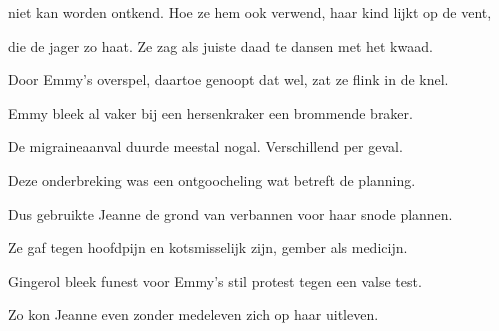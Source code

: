 niet kan worden ontkend.
Hoe ze hem ook verwend,
haar kind lijkt op de vent,

die de jager zo haat.
Ze zag als juiste daad
te dansen met het kwaad.

Door Emmy’s overspel,
daartoe genoopt dat wel,
zat ze flink in de knel.

Emmy bleek al vaker
bij een hersenkraker
een brommende braker.

De migraineaanval
duurde meestal nogal.
Verschillend per geval.

Deze onderbreking
was een ontgoocheling
wat betreft de planning.

Dus gebruikte Jeanne
de grond van verbannen
voor haar snode plannen.

Ze gaf tegen hoofdpijn
en kotsmisselijk zijn,
gember als medicijn.

Gingerol bleek funest
voor Emmy’s stil protest
tegen een valse test.

Zo kon Jeanne even
zonder medeleven
zich op haar uitleven.
